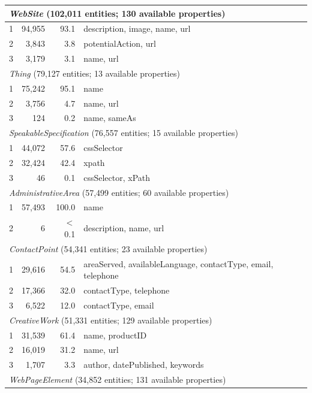 \documentclass[11pt,a4paper]{article}
\begin{document}
\begin{longtable}{rrrp{9cm}}
%
\multicolumn{4}{l}{\textit{WebSite} (102{,}011 entities; 130 available properties)} \\
\midrule
1 &  94{,}955 & 93.1 & \scriptsize description, image, name, url \\[2pt]
2 &   3{,}843 &  3.8 & \scriptsize potentialAction, url \\[2pt]
3 &   3{,}179 &  3.1 & \scriptsize name, url \\[4pt]
%
\multicolumn{4}{l}{\textit{Thing} (79{,}127 entities; 13 available properties)} \\
\midrule
1 &  75{,}242 & 95.1 & \scriptsize name \\[2pt]
2 &   3{,}756 &  4.7 & \scriptsize name, url \\[2pt]
3 &       124 &  0.2 & \scriptsize name, sameAs \\[4pt]
%
\multicolumn{4}{l}{\textit{SpeakableSpecification} (76{,}557 entities; 15 available properties)} \\
\midrule
1 &  44{,}072 & 57.6 & \scriptsize cssSelector \\[2pt]
2 &  32{,}424 & 42.4 & \scriptsize xpath \\[2pt]
3 &        46 &  0.1 & \scriptsize cssSelector, xPath \\[4pt]
%
\multicolumn{4}{l}{\textit{AdministrativeArea} (57{,}499 entities; 60 available properties)} \\
\midrule
1 &  57{,}493 & 100.0 & \scriptsize name \\[2pt]
2 &         6 & $<$0.1 & \scriptsize description, name, url \\[4pt]
%
\multicolumn{4}{l}{\textit{ContactPoint} (54{,}341 entities; 23 available properties)} \\
\midrule
1 &  29{,}616 & 54.5 & \scriptsize areaServed, availableLanguage, contactType, email, telephone \\[2pt]
2 &  17{,}366 & 32.0 & \scriptsize contactType, telephone \\[2pt]
3 &   6{,}522 & 12.0 & \scriptsize contactType, email \\[4pt]
%
\multicolumn{4}{l}{\textit{CreativeWork} (51{,}331 entities; 129 available properties)} \\
\midrule
1 &  31{,}539 & 61.4 & \scriptsize name, productID \\[2pt]
2 &  16{,}019 & 31.2 & \scriptsize name, url \\[2pt]
3 &   1{,}707 &  3.3 & \scriptsize author, datePublished, keywords \\[4pt]
%
\multicolumn{4}{l}{\textit{WebPageElement} (34{,}852 entities; 131 available properties)} \\

\end{longtable}
\end{document}
